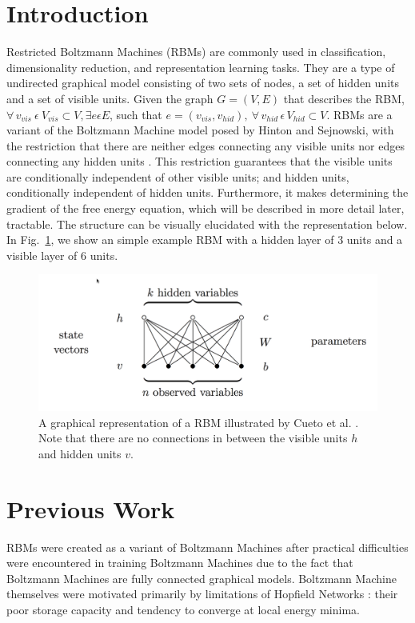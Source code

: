 \documentclass[journal]{IEEEtran}
\begin{document}
\section{Introduction}
Restricted Boltzmann Machines (RBMs) are commonly used in classification, dimensionality reduction, and representation learning tasks. They are a type of undirected graphical model consisting of two sets of nodes, a set of hidden units and a set of visible units.  Given the graph $G = (V,E)$ that describes the RBM, $\forall \, v_{vis} \: \epsilon \: V_{vis} \subset V,\exists e \epsilon E$, such that $ e = (v_{vis}, v_{hid}),\: \forall \, v_{hid} \, \epsilon \, V_{hid} \subset V$.  RBMs are a variant of the Boltzmann Machine model \cite{ackley1985learning} posed by Hinton and Sejnowski, with the restriction that there are neither edges connecting any visible units nor edges connecting any hidden units \cite{hinton2006fast}. This restriction guarantees that the visible units are conditionally independent of other visible units; and hidden units, conditionally independent of hidden units. Furthermore, it makes determining the gradient of the free energy equation, which will be described in more detail later, tractable. The structure can be visually elucidated with the representation below. In Fig.~\ref{rbm}, we show an simple example RBM with a hidden layer of 3 units and a visible layer of 6 units.

\begin{figure}[h]
  \centering
  \includegraphics[width=0.9\linewidth]{rbm.png}
  \caption{A graphical representation of a RBM illustrated by Cueto et al. \cite{cueto2009geometry}. Note that there are no connections in between the visible units $h$ and hidden units $v$.}
  \label{rbm}
\end{figure}

\section{Previous Work}
RBMs were created as a variant of Boltzmann Machines after practical difficulties were encountered in training Boltzmann Machines due to the fact that Boltzmann Machines are fully connected graphical models. Boltzmann Machine themselves were motivated primarily by limitations of Hopfield Networks \cite{hopfield1985neural}: their poor storage capacity and tendency to converge at local energy minima.  
\end{document}
